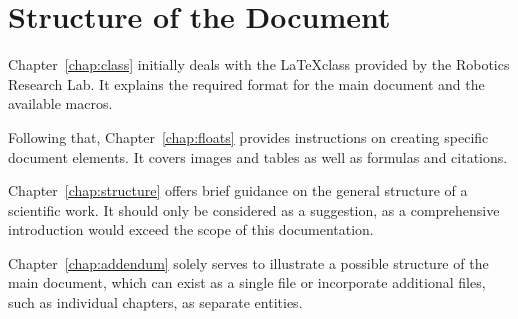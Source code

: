 \section{Structure of the Document}
\label{sec:intro:structure}
Chapter~\ref{chap:class} initially deals with the \LaTeX class \latexklasse provided by the Robotics Research Lab. It explains the required format for the main document and the available macros.

Following that, Chapter~\ref{chap:floats} provides instructions on creating specific document elements. It covers images and tables as well as formulas and citations.

Chapter~\ref{chap:structure} offers brief guidance on the general structure of a scientific work. It should only be considered as a suggestion, as a comprehensive introduction would exceed the scope of this documentation.

Chapter~\ref{chap:addendum} solely serves to illustrate a possible structure of the main document, which can exist as a single file or incorporate additional files, such as individual chapters, as separate entities.

